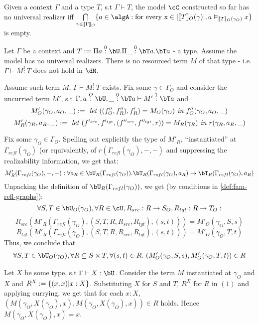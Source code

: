 \documentclass[12pt,a4paper]{article}
\def\src{_{src}}
\def\rfl{_{refl}}
\def\tgt{_{tgt}}
\renewcommand{\O}{_{O}}\alwaysmath{O}
\newcommand{\R}{\ensuremath{_{R}}}
\begin{document}
\begin{definition}
  Given a context $\Gamma$ and a type $T$, s.t $\Gamma \vdash  T$, the model $\cC$ constructed so far has no universal realizer iff $\bigcap\limits_{\gamma \in \llbracket\Gamma\rrbracket\O} \{ a \in \algA :  \text{for every x} \in \carr{\llbracket T\rrbracket \O(\gamma)}, a \vDash_{\llbracket T \rrbracket \O(\gamma\O)} x\}$ is empty.
\end{definition}

\begin{thm}
  Let $\Gamma$ be a context and $T \define \Pi a \overset{0}{:} \bU . \Pi \_ \overset{0}{:} \bT a . \bT a$  - a type. Assume the model has no universal realizers. There is no resourced term $M$ of that type - i.e. $\Gamma \vdash M \overset{1}{:} T$ does not hold in $\dM$.
\end{thm}

Assume such term $M$, $\Gamma \vdash M \overset{1}{:} T$ exists. Fix some $\gamma \in \Gamma\O$ and consider the uncurried term $M'$, s.t $\Gamma, a \overset{O}{:} \bU, \_ \overset{0}: \bT a \vdash M' \overset{1}{:} \bT a$ and
$$ M'\O(\gamma\O, a\O, \_) \define \textit{ let } ((f''\O, f''\R) , f'\R)= M\O(\gamma\O) \textit{ in } f''\O(\gamma\O, a\O, \_)$$
$$ M'\R(\gamma\R, a\R, \_) \define \textit{ let } (f'^{\src}, f'^{\tgt}, (f''^{\src}, f''^{\tgt}, r)) = M\R(\gamma\R) \textit{ in } r(\gamma\R, a\R, \_)$$

Fix some $\gamma\O \in \Gamma\O$. Spelling out explicitly the type of $M'\R$, ``instantiated'' at $\Gamma\rfl(\gamma\O)$ (or equivalently, of $r(\Gamma\rfl(\gamma\O), - , -)$ and suppressing the realizability information, we get that:
$$M'\R(\Gamma\rfl(\gamma\O), -, -) : \forall a\R \in \bU\R(\Gamma\rfl(\gamma\O)). \bT\R(\Gamma\rfl(\gamma\O), a\R) \to \bT\R(\Gamma\rfl(\gamma\O), a\R)$$
Unpacking the definition of $\bU\R(\Gamma\rfl(\gamma\O))$, we get (by conditions in \cref{def:fam-refl-graphs}):
$$\forall S, T \in \bU\O(\gamma\O), \forall R \in \cU , R\src : R \to S\O, R\tgt : R \to T\O:$$
$$R\src(M'\R(\Gamma\rfl(\gamma\O),(S,T,R, R\src, R\tgt), (s,t))) = M'\O(\gamma\O, S, s)$$
$$R\tgt(M'\R(\Gamma\rfl(\gamma\O),(S,T,R, R\src, R\tgt),  (s,t))) = M'\O(\gamma\O, T, t)$$
Thus, we conclude that 
\begin{align}
\forall S, T \in \bU\O(\gamma\O), \forall R \subseteq S \times T,  \forall (s,t) \in R.\ (M'\O(\gamma\O, S, s), M'\O(\gamma\O, T, t)) \in R
\end{align}

Let $X$ be some type, s.t $\Gamma \vdash X : \bU$. Consider the term $M$ instantiated at $\gamma\O$ and $X$ and $R^X := \{(x,x) | x : X\}$. Substituting $X$ for $S$ and $T$, $R^X$ for $R$ in $(1)$ and applying currying, we get that for each $x : X$, $(M(\gamma\O, X(\gamma\O), x), M(\gamma\O, X(\gamma\O), x)) \in R$ holds. Hence $M(\gamma\O, X(\gamma\O), x) = x$.\\
\end{document}
